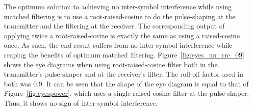 \begin{refsection}
The optimum solution to achieving no inter-symbol interference while using
matched filtering is to use a root-raised-cosine to do the pulse-shaping at the
transmitter and the filtering at the receiver. The corresponding output of
applying twice a root-raised-cosine is exactly the same as using a
raised-cosine once. As such, the end result suffers from no inter-symbol
interference while reaping the benefits of optimum matched filtering.
Figure~\ref{fig:eyes_nn_rrc_09} shows the eye diagrams when using
root-raised-cosine filter both in the transmitter's pulse-shaper and at the
receiver's filter. The roll-off factor used in both was 0.9. It can be seen
that the shape of the eye diagram is equal to that of
Figure~\ref{fig:eyespower}, which uses a single raised cosine filter at the
pulse-shaper. Thus, it shows no sign of inter-symbol interference.
\begin{table}[H]
	\centering
	

\end{table}
\end{refsection}
